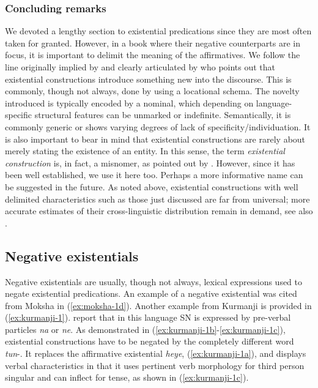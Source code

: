 \documentclass[output=paper,chinesefont,colorlinks,citecolor=brown]{langscibook}
\begin{document}
\subsubsection{Concluding remarks}\label{sec:intro:2.2.5}
We devoted a lengthy section to existential predications since they are most often taken for granted. However, in a book where their negative counterparts are in focus, it is important to delimit the meaning of the affirmatives. We follow the line originally implied by \citet[154]{jespersen1924} and clearly articulated by \citet[241]{dryer2007a} who points out that existential constructions introduce something new into the discourse. This is commonly, though not always, done by using a locational schema. The novelty introduced is typically encoded by a nominal, which depending on language-specific structural features can be unmarked or indefinite. Semantically, it is commonly generic or shows varying degrees of lack of specificity/individuation. It is also important to bear in mind that existential constructions are rarely about merely stating the existence of an entity. In this sense, the term \textit{existential construction} is, in fact, a misnomer, as pointed out by \citet[241]{dryer2007a}. However, since it has been well established, we use it here too. Perhaps a more informative name can be suggested in the future. As noted above, existential constructions with well delimited characteristics such as those just discussed are far from universal; more accurate estimates of their cross-linguistic distribution remain in demand, see also \citet{creissels2019}.

\subsection{Negative existentials}\label{sect:negex}\label{sec:intro:2.3}
Negative existentials are usually, though not always, lexical expressions used to negate existential predications. An example of a negative existential was cited from Moksha in (\ref{ex:moksha-1d}). Another example from Kurmanji is provided in (\ref{ex:kurmanji-1}).  report that in this language SN is expressed by pre-verbal particles \textit{na} or \textit{ne}. As demonstrated in (\ref{ex:kurmanji-1b}-\ref{ex:kurmanji-1c}), existential constructions have to be negated by the completely different word \textit{tun}-. It replaces the affirmative existential \textit{heye}, (\ref{ex:kurmanji-1a}), and displays verbal characteristics in that it uses pertinent verb morphology for third person singular and can inflect for tense, as shown in (\ref{ex:kurmanji-1c}).
\end{document}
